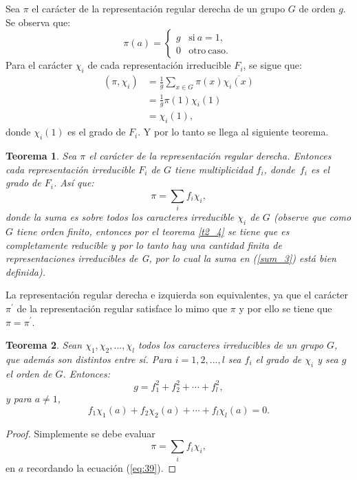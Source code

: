 \documentclass[12pt]{book}
\newtheorem{theorem}{Teorema}[section]
\theoremstyle{definition}
\newcounter{in}
\newcounter{ini}
\begin{document}
Sea $\pi$ el carácter de la representación regular derecha de un grupo
$G$ de orden $g$. Se observa que:
\begin{equation}
  \label{eq:39}
   \pi(a) = \left\{
     \begin{array}{ll}
       g      & \mathrm{si\ } a = 1, \\
       0      & \mathrm{otro\ caso.\ } 
     \end{array}
   \right.
\end{equation}
Para el carácter $\chi_{i}$ de cada representación irreducible
$F_{i}$, se sigue que:
\begin{equation}
  \label{eq:40}
  \begin{aligned}
    (\pi,\chi_{i}) & =\frac{1}{g} \sum_{x \in G} \pi(x) \overline{\chi_{i}(x)} \\
    &=\frac{1}{g} \pi(1) \chi_{i}(1) \\
    &=\chi_{i}(1),
  \end{aligned}
\end{equation}
donde $\chi_{i}(1)$ es el grado de $F_{i}$. Y por lo tanto se llega al
siguiente teorema.
\begin{theorem}
  \label{t4_7}
  Sea $\pi$ el carácter de la representación regular derecha. Entonces
  cada representación irreducible $F_{i}$ de $G$ tiene multiplicidad
  $f_{i}$, donde~$f_{i}$ es el grado de $F_{i}$. Así que:
  \begin{equation}
  \label{sum_3}
    \pi=\sum_{i} f_{i} \chi_{i},
  \end{equation}
  donde la suma es sobre todos los caracteres irreducible $\chi_{i}$ de $G$ (observe que como $G$ tiene orden finito, entonces por el teorema \ref{t2_4} se tiene que es completamente reducible y por lo tanto hay una cantidad finita de representaciones irreducibles de G, por lo cual la suma en (\ref{sum_3}) está bien definida).
\end{theorem}
La representación regular derecha e izquierda son equivalentes, ya que
el carácter $\pi^{'}$ de la representación regular satisface lo mimo
que $\pi$ y por ello se tiene que $\pi = \pi^{'}$.
\begin{theorem}
  \label{t4_8}
  Sean $\chi_{1}, \chi_{2},...,\chi_{l} $ todos
  los caracteres irreducibles de un grupo $G$, que además son distintos
  entre sí. Para $i=1, 2,..., l$ sea $f_{i}$ el grado de $\chi_{i}$ y sea
  $g$ el orden de $G$. Entonces:
  \begin{equation*}
    g=f_{1}^{2}+f_{2}^{2}+ \cdots + f_{l}^{2},
  \end{equation*}
  y para $a \neq 1$,
  \begin{equation*}
    f_{1} \chi_{1}(a)+f_{2} \chi_{2}(a)+ \cdots + f_{l} \chi_{l}(a) = 0.
  \end{equation*}
\end{theorem}
\begin{proof}
  Simplemente se debe evaluar
  \begin{equation}
    \label{eq:41}
    \pi=\sum_{i} f_{i} \chi_{i},
  \end{equation}
 en $a$ recordando la ecuación (\ref{eq:39}).
\end{proof}
\end{document}
